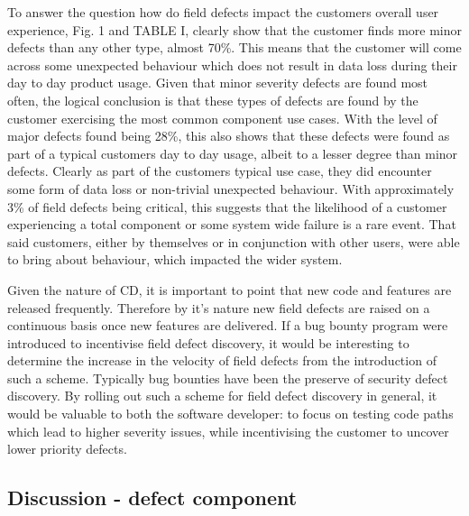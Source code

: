 To answer the question how do field defects impact the customers overall user experience, Fig. 1 and TABLE I, clearly show that the customer finds more minor defects than any other type, almost 70\%. This means that the customer will come across some unexpected behaviour which does not result in data loss during their day to day product usage. Given that minor severity defects are found most often, the logical conclusion is that these types of defects are found by the customer exercising the most common component use cases. With the level of major defects found being 28\%, this also shows that these defects were found as part of a typical customers day to day usage, albeit to a lesser degree than minor defects. Clearly as part of the customers typical use case, they did encounter some form of data loss or non-trivial unexpected behaviour. With approximately 3\% of field defects being critical, this suggests that the likelihood of a customer experiencing a total component or some system wide failure is a rare event. That said customers, either by themselves or in conjunction with other users, were able to bring about behaviour, which impacted the wider system. \par

Given the nature of CD, it is important to point that new code and features are released frequently. Therefore by it's nature new field defects are raised on a continuous basis once new features are delivered. If a bug bounty program were introduced to incentivise field defect discovery, it would be interesting to determine the increase in the velocity of field defects from the introduction of such a scheme. Typically bug bounties have been the preserve of security defect discovery. By rolling out such a scheme for field defect discovery in general, it would be valuable to both the software developer: to focus on testing code paths which lead to higher severity issues, while incentivising the customer to uncover lower priority defects.

\subsection{Discussion - defect component}

